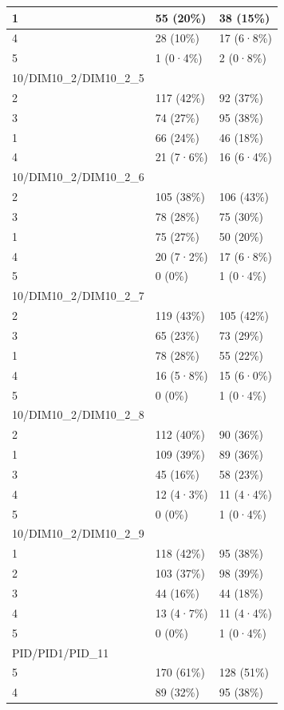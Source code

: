 \documentclass[
]{book}
\begin{document}
\begin{tabular}{l|l|l}
\hline
1 & 55 (20\%) & 38 (15\%)\\
\hline
4 & 28 (10\%) & 17 (6·8\%)\\
\hline
5 & 1 (0·4\%) & 2 (0·8\%)\\
\hline
10/DIM10\_2/DIM10\_2\_5 &  & \\
\hline
2 & 117 (42\%) & 92 (37\%)\\
\hline
3 & 74 (27\%) & 95 (38\%)\\
\hline
1 & 66 (24\%) & 46 (18\%)\\
\hline
4 & 21 (7·6\%) & 16 (6·4\%)\\
\hline
10/DIM10\_2/DIM10\_2\_6 &  & \\
\hline
2 & 105 (38\%) & 106 (43\%)\\
\hline
3 & 78 (28\%) & 75 (30\%)\\
\hline
1 & 75 (27\%) & 50 (20\%)\\
\hline
4 & 20 (7·2\%) & 17 (6·8\%)\\
\hline
5 & 0 (0\%) & 1 (0·4\%)\\
\hline
10/DIM10\_2/DIM10\_2\_7 &  & \\
\hline
2 & 119 (43\%) & 105 (42\%)\\
\hline
3 & 65 (23\%) & 73 (29\%)\\
\hline
1 & 78 (28\%) & 55 (22\%)\\
\hline
4 & 16 (5·8\%) & 15 (6·0\%)\\
\hline
5 & 0 (0\%) & 1 (0·4\%)\\
\hline
10/DIM10\_2/DIM10\_2\_8 &  & \\
\hline
2 & 112 (40\%) & 90 (36\%)\\
\hline
1 & 109 (39\%) & 89 (36\%)\\
\hline
3 & 45 (16\%) & 58 (23\%)\\
\hline
4 & 12 (4·3\%) & 11 (4·4\%)\\
\hline
5 & 0 (0\%) & 1 (0·4\%)\\
\hline
10/DIM10\_2/DIM10\_2\_9 &  & \\
\hline
1 & 118 (42\%) & 95 (38\%)\\
\hline
2 & 103 (37\%) & 98 (39\%)\\
\hline
3 & 44 (16\%) & 44 (18\%)\\
\hline
4 & 13 (4·7\%) & 11 (4·4\%)\\
\hline
5 & 0 (0\%) & 1 (0·4\%)\\
\hline
PID/PID1/PID\_11 &  & \\
\hline
5 & 170 (61\%) & 128 (51\%)\\
\hline
4 & 89 (32\%) & 95 (38\%)\\

\end{tabular}
\end{document}
